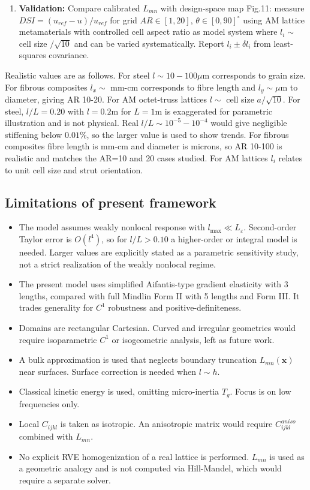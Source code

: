 \documentclass[final,3p,times,fleqn]{elsarticle}
\newcommand{\rev}[1]{\textcolor{revcolor}{#1}}
\begin{document}
\begin{enumerate}
  \item \rev{\textbf{Validation:} Compare calibrated $L_{mn}$ with design-space map Fig.11: measure $DSI=(u_{ref}-u)/u_{ref}$ for grid $AR\in[1,20]$, $\theta\in[0,90]^\circ$ using AM lattice metamaterials with controlled cell aspect ratio as model system where $l_i\sim$ cell size $/\sqrt{10}$ and can be varied systematically. Report $l_i\pm \delta l_i$ from least-squares covariance.}
\end{enumerate}

\rev{Realistic values are as follows. For steel $l\sim10-100\mu$m corresponds to grain size. For fibrous composites $l_x\sim$ mm-cm corresponds to fibre length and $l_y\sim\mu$m to diameter, giving AR 10-20. For AM octet-truss lattices $l\sim$ cell size $a/\sqrt{10}$. For steel, $l/L=0.20$ with $l=0.2$m for $L=1$m is exaggerated for parametric illustration and is not physical. Real $l/L\sim10^{-5}-10^{-4}$ would give negligible stiffening below $0.01\%$, so the larger value is used to show trends. For fibrous composites fibre length is mm-cm and diameter is microns, so AR 10-100 is realistic and matches the AR=10 and 20 cases studied. For AM lattices $l_i$ relates to unit cell size and strut orientation.}

\subsection{Limitations of present framework}
\begin{itemize}
  \item \rev{The model assumes weakly nonlocal response with $l_{\max}\ll L_\varepsilon$. Second-order Taylor error is $O(l^4)$, so for $l/L>0.10$ a higher-order or integral model is needed. Larger values are explicitly stated as a parametric sensitivity study, not a strict realization of the weakly nonlocal regime.}
  \item \rev{The present model uses simplified Aifantis-type gradient elasticity with 3 lengths, compared with full Mindlin Form II with 5 lengths and Form III. It trades generality for $C^1$ robustness and positive-definiteness.}
  \item \rev{Domains are rectangular Cartesian. Curved and irregular geometries would require isoparametric $C^1$ or isogeometric analysis, left as future work.}
  \item \rev{A bulk approximation is used that neglects boundary truncation $L_{mn}(\mathbf{x})$ near surfaces. Surface correction is needed when $l\sim h$.}
  \item \rev{Classical kinetic energy is used, omitting micro-inertia $T_g$. Focus is on low frequencies only.}
  \item \rev{Local $C_{ijkl}$ is taken as isotropic. An anisotropic matrix would require $C^{aniso}_{ijkl}$ combined with $L_{mn}$.}
  \item \rev{No explicit RVE homogenization of a real lattice is performed. $L_{mn}$ is used as a geometric analogy and is not computed via Hill-Mandel, which would require a separate solver.}
\end{itemize}
\end{document}
